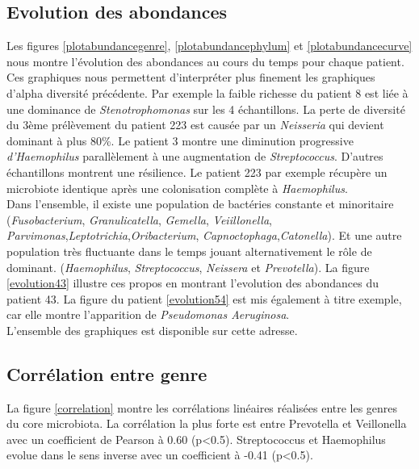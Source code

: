 \documentclass[12pt,a4paper]{article}
\begin{document}
\subsection{Evolution des abondances}
Les figures \ref{plotabundancegenre}, \ref{plotabundancephylum} et \ref{plotabundancecurve} nous montre l’évolution des abondances au cours du temps pour chaque patient. Ces graphiques nous permettent d’interpréter plus finement les graphiques d’alpha diversité précédente.
Par exemple la faible richesse du patient 8 est liée à une dominance de \textit{Stenotrophomonas} sur les 4 échantillons.
La perte de diversité du 3ème prélèvement du patient 223 est causée par un \textit{Neisseria} qui devient dominant à plus 80\%.
Le patient 3 montre une diminution progressive \textit{d’Haemophilus} parallèlement à une augmentation de \textit{Streptococcus}.
D’autres échantillons montrent une résilience. Le patient 223 par exemple récupère un microbiote identique après une colonisation complète à \textit{Haemophilus}. \\
Dans l’ensemble, il existe une population de bactéries constante et minoritaire (\textit{Fusobacterium}, \textit{Granulicatella}, \textit{Gemella}, \textit{Veiillonella}, \textit{Parvimonas},\textit{Leptotrichia},\textit{Oribacterium}, \textit{Capnoctophaga},\textit{Catonella}). Et une autre population très fluctuante dans le temps jouant alternativement le rôle de dominant. (\textit{Haemophilus}, \textit{Streptococcus}, \textit{Neissera} et \textit{Prevotella}).
La figure \ref{evolution43} illustre ces propos en montrant l'evolution des abondances du patient 43.
La figure du patient \ref{evolution54} est mis également à titre exemple, car elle montre l’apparition de \textit{Pseudomonas Aeruginosa}. \\
L’ensemble des graphiques est disponible sur cette adresse.

\subsection{Corrélation entre genre }
La figure \ref{correlation} montre les corrélations linéaires réalisées entre les genres du core microbiota. La corrélation la plus forte est entre Prevotella et Veillonella avec un coefficient de Pearson à 0.60 (p<0.5).  Streptococcus et Haemophilus evolue dans le sens inverse avec un coefficient à -0.41  (p<0.5). 
 
\end{document}

